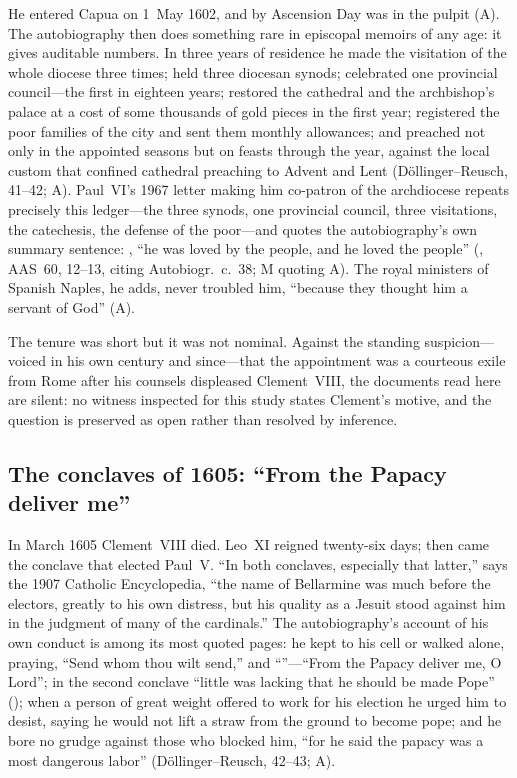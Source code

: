 He entered Capua on 1~May 1602, and by Ascension Day was in the
pulpit (A). The autobiography then does something rare in
episcopal memoirs of any age: it gives auditable numbers. In three
years of residence he made the visitation of the whole diocese
three times; held three diocesan synods; celebrated one provincial
council---the first in eighteen years; restored the cathedral and
the archbishop's palace at a cost of some thousands of gold pieces
in the first year; registered the poor families of the city and
sent them monthly allowances; and preached not only in the
appointed seasons but on feasts through the year, against the
local custom that confined cathedral preaching to Advent and Lent
(D\"ollinger--Reusch, 41--42; A). Paul~VI's 1967 letter making him
co-patron of the archdiocese repeats precisely this ledger---the
three synods, one provincial council, three visitations, the
catechesis, the defense of the poor---and quotes the
autobiography's own summary sentence: , ``he was loved by the people, and he
loved the people'' (, AAS~60, 12--13, citing
Autobiogr.\ c.~38; M quoting A). The royal ministers of Spanish
Naples, he adds, never troubled him, ``because they thought him a
servant of God'' (A).

The tenure was short but it was not nominal. Against the standing
suspicion---voiced in his own century and since---that the
appointment was a courteous exile from Rome after his  counsels displeased Clement~VIII, the documents read
here are silent: no witness inspected for this study states
Clement's motive, and the question is preserved as open rather
than resolved by inference.

\subsection{The conclaves of 1605: ``From the Papacy deliver me''}

In March 1605 Clement~VIII died. Leo~XI reigned twenty-six days;
then came the conclave that elected Paul~V. ``In both conclaves,
especially that latter,'' says the 1907 Catholic Encyclopedia,
``the name of Bellarmine was much before the electors, greatly to
his own distress, but his quality as a Jesuit stood against him in
the judgment of many of the cardinals.'' The autobiography's
account of his own conduct is among its most quoted pages: he kept
to his cell or walked alone, praying, ``Send whom thou wilt
send,'' and ``''---``From the
Papacy deliver me, O Lord''; in the second conclave ``little was
lacking that he should be made Pope'' (); when a person of great weight offered to work for
his election he urged him to desist, saying he would not lift a
straw from the ground to become pope; and he bore no grudge
against those who blocked him, ``for he said the papacy was a most
dangerous labor'' (D\"ollinger--Reusch, 42--43; A).


